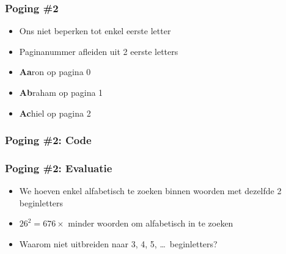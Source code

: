 \documentclass[dutch]{ucll-slides}
\begin{document}
\begin{frame}
  \frametitle{Poging \#2}
  \begin{itemize}
    \item Ons niet beperken tot enkel eerste letter
    \item Paginanummer afleiden uit 2 eerste letters
  \end{itemize}
  \begin{center}
  \end{center}
  \vskip2mm
  \begin{itemize}
    \item \textbf{Aa}ron op pagina 0
    \item \textbf{Ab}raham op pagina 1
    \item \textbf{Ac}hiel op pagina 2
  \end{itemize}
\end{frame}

\begin{frame}
  \frametitle{Poging \#2: Code}
\end{frame}

\begin{frame}
  \frametitle{Poging \#2: Evaluatie}
  \begin{itemize}
    \item We hoeven enkel alfabetisch te zoeken binnen woorden met dezelfde 2 beginletters
    \item $26^2 = 676\times$ minder woorden om alfabetisch in te zoeken
  \end{itemize}
  \vskip5mm
  \begin{itemize}
    \item Waarom niet uitbreiden naar 3, 4, 5, \dots\ beginletters?
  \end{itemize}
\end{frame}
\end{document}
